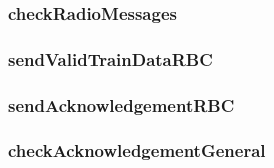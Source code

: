 \subsubsection{checkRadioMessages}


\subsubsection{sendValidTrainDataRBC}


\subsubsection{sendAcknowledgementRBC}


\subsubsection{checkAcknowledgementGeneral}




